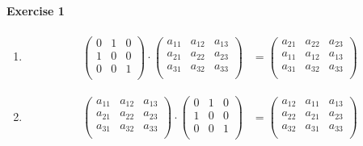 \documentclass{article}
\begin{document}
\paragraph{Exercise 1}

\begin{enumerate}
    \item \begin{align*}
        \begin{pmatrix}
            0 & 1 & 0 \\
            1 & 0 & 0 \\
            0 & 0 & 1 \\
        \end{pmatrix} \cdot \begin{pmatrix}
            a_{11} & a_{12} & a_{13} \\
            a_{21} & a_{22} & a_{23} \\
            a_{31} & a_{32} & a_{33} \\
        \end{pmatrix} &= \begin{pmatrix}
            a_{21} & a_{22} & a_{23} \\
            a_{11} & a_{12} & a_{13} \\
            a_{31} & a_{32} & a_{33} \\
        \end{pmatrix}
    \end{align*}

    \item \begin{align*}
        \begin{pmatrix}
            a_{11} & a_{12} & a_{13} \\
            a_{21} & a_{22} & a_{23} \\
            a_{31} & a_{32} & a_{33} \\
        \end{pmatrix} \cdot \begin{pmatrix}
            0 & 1 & 0 \\
            1 & 0 & 0 \\
            0 & 0 & 1 \\
        \end{pmatrix} &= \begin{pmatrix}
            a_{12} & a_{11} & a_{13} \\
            a_{22} & a_{21} & a_{23} \\
            a_{32} & a_{31} & a_{33} \\
        \end{pmatrix}
    \end{align*}


\end{enumerate}
\end{document}
